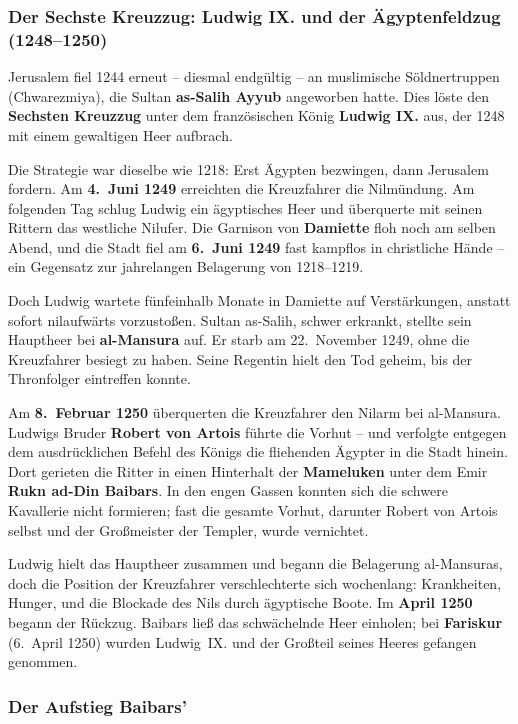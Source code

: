 \subsubsection{Der Sechste Kreuzzug: Ludwig IX. und der Ägyptenfeldzug (1248--1250)}\label{sechter_kreuzzug}

Jerusalem fiel 1244 erneut -- diesmal endgültig -- an muslimische Söldnertruppen (Chwarezmiya), die Sultan \textbf{as-Salih Ayyub} angeworben hatte. Dies löste den \textbf{Sechsten Kreuzzug} unter dem französischen König \textbf{Ludwig IX.} aus, der 1248 mit einem gewaltigen Heer aufbrach.

Die Strategie war dieselbe wie 1218: Erst Ägypten bezwingen, dann Jerusalem fordern. Am \textbf{4.~Juni 1249} erreichten die Kreuzfahrer die Nilmündung. Am folgenden Tag schlug Ludwig ein ägyptisches Heer und überquerte mit seinen Rittern das westliche Nilufer. Die Garnison von \textbf{Damiette} floh noch am selben Abend, und die Stadt fiel am \textbf{6.~Juni 1249} fast kampflos in christliche Hände -- ein Gegensatz zur jahrelangen Belagerung von 1218--1219.

Doch Ludwig wartete fünfeinhalb Monate in Damiette auf Verstärkungen, anstatt sofort nilaufwärts vorzustoßen. Sultan as-Salih, schwer erkrankt, stellte sein Hauptheer bei \textbf{al-Mansura} auf. Er starb am 22.~November 1249, ohne die Kreuzfahrer besiegt zu haben. Seine Regentin hielt den Tod geheim, bis der Thronfolger eintreffen konnte.

Am \textbf{8.~Februar 1250} überquerten die Kreuzfahrer den Nilarm bei al-Mansura. Ludwigs Bruder \textbf{Robert von Artois} führte die Vorhut -- und verfolgte entgegen dem ausdrücklichen Befehl des Königs die fliehenden Ägypter in die Stadt hinein. Dort gerieten die Ritter in einen Hinterhalt der \textbf{Mameluken} unter dem Emir \textbf{Rukn ad-Din Baibars}. In den engen Gassen konnten sich die schwere Kavallerie nicht formieren; fast die gesamte Vorhut, darunter Robert von Artois selbst und der Großmeister der Templer, wurde vernichtet.

Ludwig hielt das Hauptheer zusammen und begann die Belagerung al-Mansuras, doch die Position der Kreuzfahrer verschlechterte sich wochenlang: Krankheiten, Hunger, und die Blockade des Nils durch ägyptische Boote. Im \textbf{April 1250} begann der Rückzug. Baibars ließ das schwächelnde Heer einholen; bei \textbf{Fariskur} (6.~April 1250) wurden Ludwig~IX. und der Großteil seines Heeres gefangen genommen.

\subsubsection{Der Aufstieg Baibars'}\label{auftieg_baibars}

